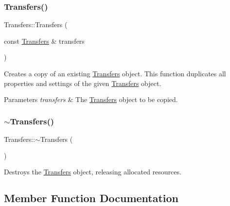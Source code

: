 \subsubsection{\texorpdfstring{Transfers()}{Transfers()}\hspace{0.1cm}{\footnotesize\ttfamily [2/2]}}
{\footnotesize\ttfamily Transfers\+::\+Transfers (\begin{DoxyParamCaption}\item[{const \mbox{\hyperlink{classTransfers}{Transfers}} \&}]{transfers }\end{DoxyParamCaption})}



Creates a copy of an existing \mbox{\hyperlink{classTransfers}{Transfers}} object. This function duplicates all properties and settings of the given \mbox{\hyperlink{classTransfers}{Transfers}} object. 


\begin{DoxyParams}{Parameters}
{\em transfers} & The \mbox{\hyperlink{classTransfers}{Transfers}} object to be copied. \\
\hline
\end{DoxyParams}
\mbox{\label{classTransfers_a5dfeafe7a9b9a446b1ab746b65ef3b4b}} 
\subsubsection{\texorpdfstring{$\sim$\+Transfers()}{~Transfers()}}
{\footnotesize\ttfamily Transfers\+::$\sim$\+Transfers (\begin{DoxyParamCaption}{ }\end{DoxyParamCaption})}



Destroys the \mbox{\hyperlink{classTransfers}{Transfers}} object, releasing allocated resources. 



\subsection{Member Function Documentation}
\mbox{\label{classTransfers_a3c1930dbeb1273c1c0be93ad5ca57357}} 
